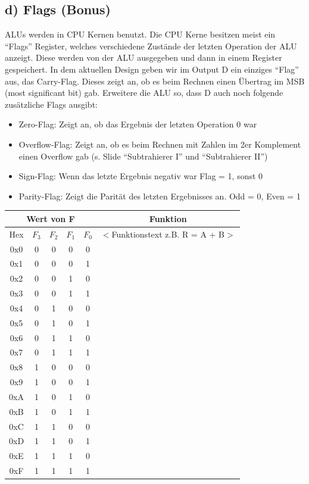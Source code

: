 \documentclass[a4paper]{scrartcl}
\begin{document}
\subsection*{d) Flags (Bonus)}
ALUs werden in CPU Kernen benutzt. Die CPU Kerne besitzen meist ein ``Flags'' Register, welches verschiedene Zustände der letzten
Operation der ALU anzeigt. Diese werden von der ALU ausgegeben und dann in einem Register gespeichert.
In dem aktuellen Design geben wir im Output D ein einziges ``Flag'' aus, das Carry-Flag. 
Dieses zeigt an, ob es beim Rechnen einen Übertrag im MSB (most significant bit) gab. Erweitere die ALU so, dass D auch noch folgende zusätzliche 
Flags ausgibt:
\begin{itemize}
  \item Zero-Flag: Zeigt an, ob das Ergebnis der letzten Operation 0 war
  \item Overflow-Flag: Zeigt an, ob es beim Rechnen mit Zahlen im 2er Komplement einen Overflow gab (s. Slide ``Subtrahierer I'' und ``Subtrahierer II'')
  \item Sign-Flag: Wenn das letzte Ergebnis negativ war Flag = 1, sonst 0
  \item Parity-Flag: Zeigt die Parität des letzten Ergebnisses an. Odd = 0, Even = 1
\end{itemize}


\newpage
\begin{table}
  \LARGE
  \centering
  \begin{tabular}[h]{c|cccc|c}
    \multicolumn{5}{c|}{\textbf{Wert von F}} & \textbf{Funktion} \\ \hline
    Hex & $F_3$ & $F_2$ & $F_1$ & $F_0$ & $<$Funktionstext z.B. R = A + B$>$\\\hline
    0x0 & 0 & 0 & 0 & 0 & \\\hline 
    0x1 & 0 & 0 & 0 & 1 & \\\hline 
    0x2 & 0 & 0 & 1 & 0 & \\\hline 
    0x3 & 0 & 0 & 1 & 1 & \\\hline 
    0x4 & 0 & 1 & 0 & 0 & \\\hline 
    0x5 & 0 & 1 & 0 & 1 & \\\hline 
    0x6 & 0 & 1 & 1 & 0 & \\\hline 
    0x7 & 0 & 1 & 1 & 1 & \\\hline 
    0x8 & 1 & 0 & 0 & 0 & \\\hline 
    0x9 & 1 & 0 & 0 & 1 & \\\hline 
    0xA & 1 & 0 & 1 & 0 & \\\hline 
    0xB & 1 & 0 & 1 & 1 & \\\hline 
    0xC & 1 & 1 & 0 & 0 & \\\hline 
    0xD & 1 & 1 & 0 & 1 & \\\hline 
    0xE & 1 & 1 & 1 & 0 & \\\hline 
    0xF & 1 & 1 & 1 & 1 & \\ 
    
  \end{tabular}
\end{table}



  
\end{document}
